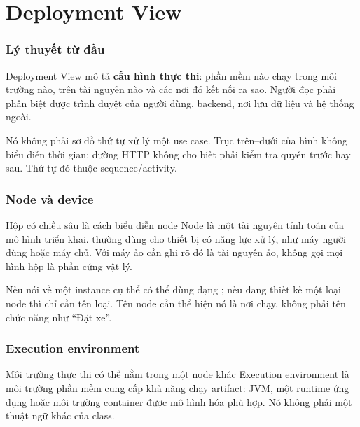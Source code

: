 \chapter{Deployment View}
\subsection{Lý thuyết từ đầu}
Deployment View mô tả \textbf{cấu hình thực thi}: phần mềm nào chạy trong môi trường nào, trên tài nguyên nào và các nơi đó kết nối ra sao. Người đọc phải phân biệt được trình duyệt của người dùng, backend, nơi lưu dữ liệu và hệ thống ngoài.

Nó không phải sơ đồ thứ tự xử lý một use case. Trục trên--dưới của hình không biểu diễn thời gian; đường HTTP không cho biết phải kiểm tra quyền trước hay sau. Thứ tự đó thuộc sequence/activity.

\subsection{Node và device}
  {Hộp có chiều sâu là cách biểu diễn node}
Node là một tài nguyên tính toán của mô hình triển khai.  thường dùng cho thiết bị có năng lực xử lý, như máy người dùng hoặc máy chủ. Với máy ảo cần ghi rõ đó là tài nguyên ảo, không gọi mọi hình hộp là phần cứng vật lý.

Nếu nói về một instance cụ thể có thể dùng dạng ; nếu đang thiết kế một loại node thì chỉ cần tên loại. Tên node cần thể hiện nó là nơi chạy, không phải tên chức năng như ``Đặt xe''.

\subsection{Execution environment}
  {Môi trường thực thi có thể nằm trong một node khác}
Execution environment là môi trường phần mềm cung cấp khả năng chạy artifact: JVM, một runtime ứng dụng hoặc môi trường container được mô hình hóa phù hợp. Nó không phải một thuật ngữ khác của class.

